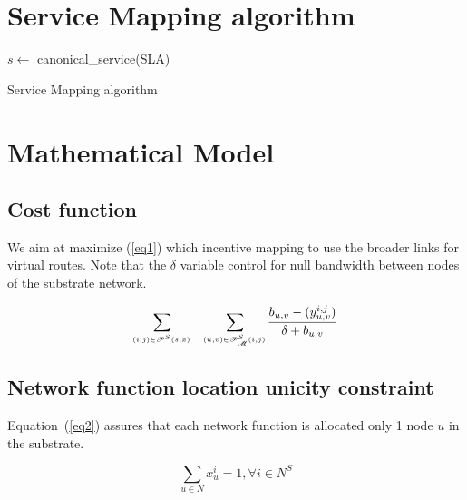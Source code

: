 \pagebreak
\begin{appendices}
	\section{Service Mapping algorithm}
	\begin{algorithm}[H]
  
  $s \leftarrow $ canonical\_service(SLA)\;
  \caption{Service Mapping algorithm}
\end{algorithm}

\section{Mathematical Model}

\subsection{Cost function}

We aim at maximize (\ref{eq1}) which incentive mapping to use the broader links for virtual routes. Note that the $\delta$ variable control for null bandwidth between nodes of the substrate network.

\begin{equation} \label{eq1}
			\sum_{
			\!\mathsmaller{
			(i,j)\in\mathscr{P}^{S}(s,x)
			}
			}{\quad\sum_{
			\!\mathsmaller{
			{(u,v)\in\mathscr{P}^{S}_{\mathscr{M}}(i,j)}
			}
			}{   \frac{b_{u,v}-(y^{i,j}_{u,v})}{\delta+b_{u,v}}         }}\\
\end{equation}
\subsection{Network function location unicity constraint}

Equation~(\ref{eq2}) assures that each network function is allocated only 1 node $u$ in the substrate.

\begin{equation}  \label{eq2}
		\sum_{u\in N} x_u^{i}=1, \forall i \in N^{S}
\end{equation}


\end{appendices}
